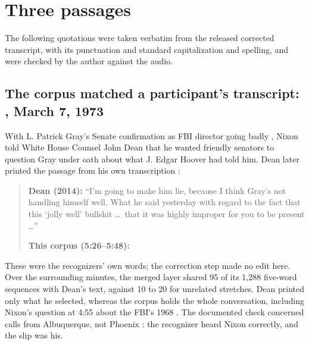 \section{Three passages}
\label{sec:cases}

The following quotations were taken verbatim from the released corrected transcript, with its punctuation and standard capitalization and spelling, and were checked by the author against the audio.

\subsection{The corpus matched a participant's transcript: , March 7, 1973}
\label{sec:case-dean}

With L. Patrick Gray's Senate confirmation as FBI director going badly \citep{crs2018fbi}, Nixon told White House Counsel John Dean that he wanted friendly senators to question Gray under oath about what J. Edgar Hoover had told him. Dean later printed the passage from his own transcription \citep[Conversation No.~871-4]{dean2014defense}:

\begin{quote}\small
\textbf{Dean (2014):} \enquote{I'm going to make him lie, because I think Gray's not handling himself well. What he said yesterday with regard to the fact that this `jolly well' bullshit \ldots\ that it was highly improper for you to be present \ldots}

\textbf{This corpus (5:26--5:48):} 
\end{quote}

These were the recognizers' own words; the correction step made no edit here. Over the surrounding minutes, the merged layer shared 95 of its 1,288 five-word sequences with Dean's text, against 10 to 20 for unrelated stretches. Dean printed only what he selected, whereas the corpus holds the whole conversation, including Nixon's question at 4:55 about the FBI's 1968 . The documented check concerned calls from Albuquerque, not Phoenix \citep{johnson1968deloach,hughes2014chasing}: the recognizer heard Nixon correctly, and the slip was his.

